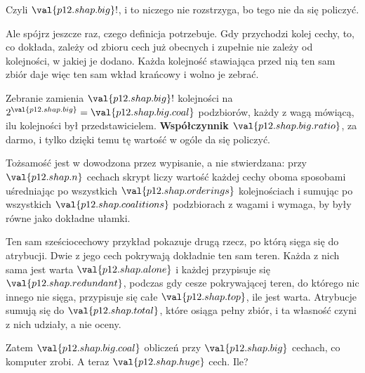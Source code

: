 \begin{fr}
Czyli $\val{p12.shap.big}!$, i to niczego nie rozstrzyga, bo tego nie da się
policzyć.

Ale spójrz jeszcze raz, czego definicja potrzebuje. Gdy przychodzi kolej
cechy, to, co dokłada, zależy od zbioru cech już obecnych \dash{} i zupełnie
nie zależy od kolejności, w jakiej je dodano. Każda kolejność stawiająca przed
nią ten sam zbiór daje więc ten sam wkład krańcowy i wolno je zebrać.

Zebranie zamienia $\val{p12.shap.big}!$ kolejności na
$2^{\val{p12.shap.big}} = \val{p12.shap.big.coal}$ podzbiorów, każdy z wagą
mówiącą, ilu kolejności był przedstawicielem. \textbf{Współczynnik
$\val{p12.shap.big.ratio}$}, za darmo, i tylko dzięki temu tę wartość w ogóle
da się policzyć.

\end{fr}

\begin{fr}
\begin{note}
Tożsamość jest w  dowodzona przez wypisanie,
a nie stwierdzana: przy $\val{p12.shap.n}$ cechach skrypt liczy wartość każdej
cechy oboma sposobami \dash{} uśredniając po wszystkich
$\val{p12.shap.orderings}$ kolejnościach i sumując po wszystkich
$\val{p12.shap.coalitions}$ podzbiorach z wagami \dash{} i wymaga, by były
równe jako dokładne ułamki.

Ten sam sześciocechowy przykład pokazuje drugą rzecz, po którą sięga się do
atrybucji. Dwie z jego cech pokrywają dokładnie ten sam teren. Każda z nich
sama jest warta $\val{p12.shap.alone}$ i każdej przypisuje się
$\val{p12.shap.redundant}$, podczas gdy cesze pokrywającej teren, do którego
nic innego nie sięga, przypisuje się całe $\val{p12.shap.top}$, ile jest
warta. Atrybucje sumują się do $\val{p12.shap.total}$, które osiąga pełny
zbiór, i ta własność czyni z nich udziały, a nie oceny.
\end{note}

Zatem $\val{p12.shap.big.coal}$ obliczeń przy $\val{p12.shap.big}$ cechach, co
komputer zrobi. A teraz $\val{p12.shap.huge}$ cech. Ile?
\nextframe
\end{fr}

